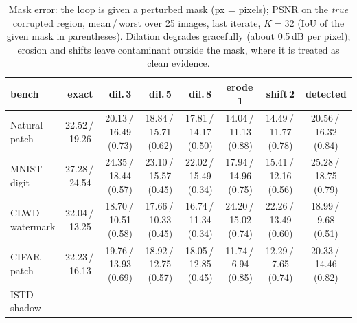 \begin{table}[t]
\centering\small
\caption{Mask error: the loop is given a perturbed mask (px = pixels); PSNR on the \emph{true} corrupted region, mean\,/\,worst over 25 images, last iterate, $K{=}32$ (IoU of the given mask in parentheses). Dilation degrades gracefully (about 0.5\,dB per pixel); erosion and shifts leave contaminant outside the mask, where it is treated as clean evidence.}
\label{tab:ablation_mask}
\begin{tabular}{lccccccc}
\toprule
bench & exact & dil.\,3 & dil.\,5 & dil.\,8 & erode\,1 & shift\,2 & detected \\
\midrule
Natural patch & 22.52\,/\,19.26 & 20.13\,/\,16.49 (0.73) & 18.84\,/\,15.71 (0.62) & 17.81\,/\,14.17 (0.50) & 14.04\,/\,11.13 (0.88) & 14.49\,/\,11.77 (0.78) & 20.56\,/\,16.32 (0.84) \\
MNIST digit & 27.28\,/\,24.54 & 24.35\,/\,18.44 (0.57) & 23.10\,/\,15.57 (0.45) & 22.02\,/\,15.49 (0.34) & 17.94\,/\,14.96 (0.75) & 15.41\,/\,12.16 (0.56) & 25.28\,/\,18.75 (0.79) \\
CLWD watermark & 22.04\,/\,13.25 & 18.70\,/\,10.51 (0.58) & 17.66\,/\,10.33 (0.45) & 16.74\,/\,11.34 (0.34) & 24.20\,/\,15.02 (0.74) & 22.26\,/\,13.49 (0.60) & 18.99\,/\,9.68 (0.51) \\
CIFAR patch & 22.23\,/\,16.13 & 19.76\,/\,13.93 (0.69) & 18.92\,/\,12.75 (0.57) & 18.05\,/\,12.85 (0.45) & 11.74\,/\,6.94 (0.85) & 12.29\,/\,7.65 (0.74) & 20.33\,/\,14.46 (0.82) \\
ISTD shadow & -- & -- & -- & -- & -- & -- & -- \\
\bottomrule
\end{tabular}
\end{table}
